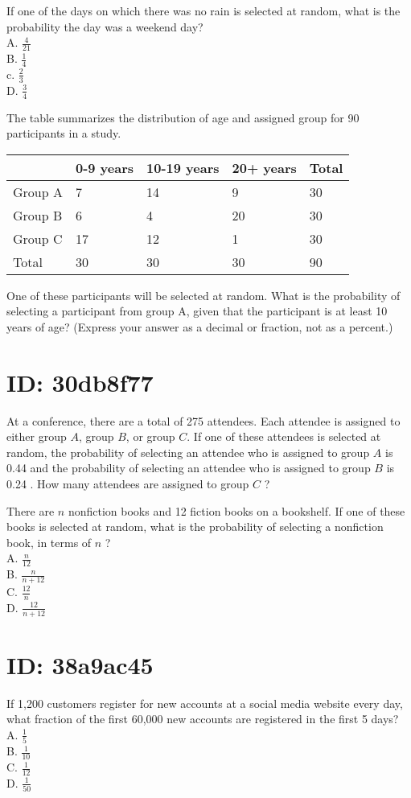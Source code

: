 If one of the days on which there was no rain is selected at random, what is the probability the day was a weekend day?\\
A. $\frac{4}{21}$\\
B. $\frac{1}{4}$\\
c. $\frac{2}{3}$\\
D. $\frac{3}{4}$

The table summarizes the distribution of age and assigned group for 90 participants in a study.

\begin{center}
\begin{tabular}{|l|l|l|l|l|}
\hline
 & 0-9 years & 10-19 years & 20+ years & Total \\
\hline
Group A & 7 & 14 & 9 & 30 \\
\hline
Group B & 6 & 4 & 20 & 30 \\
\hline
Group C & 17 & 12 & 1 & 30 \\
\hline
Total & 30 & 30 & 30 & 90 \\
\hline
\end{tabular}
\end{center}

One of these participants will be selected at random. What is the probability of selecting a participant from group A, given that the participant is at least 10 years of age? (Express your answer as a decimal or fraction, not as a percent.)

\section*{ID: 30db8f77}
At a conference, there are a total of 275 attendees. Each attendee is assigned to either group $A$, group $B$, or group $C$. If one of these attendees is selected at random, the probability of selecting an attendee who is assigned to group $A$ is 0.44 and the probability of selecting an attendee who is assigned to group $B$ is 0.24 . How many attendees are assigned to group $C$ ?

There are $n$ nonfiction books and 12 fiction books on a bookshelf. If one of these books is selected at random, what is the probability of selecting a nonfiction book, in terms of $n$ ?\\
A. $\frac{n}{12}$\\
B. $\frac{n}{n+12}$\\
C. $\frac{12}{n}$\\
D. $\frac{12}{n+12}$

\section*{ID: 38a9ac45}
If 1,200 customers register for new accounts at a social media website every day, what fraction of the first 60,000 new accounts are registered in the first 5 days?\\
A. $\frac{1}{5}$\\
B. $\frac{1}{10}$\\
C. $\frac{1}{12}$\\
D. $\frac{1}{50}$

